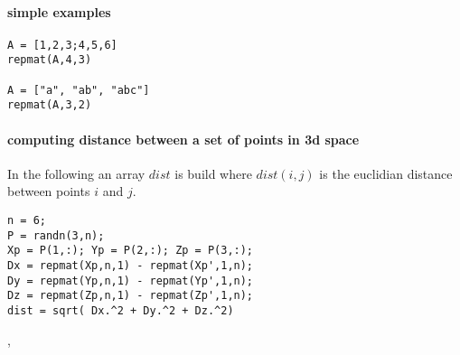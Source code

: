 \begin{examples}

\paragraph{simple examples}
\begin{Verbatim}
A = [1,2,3;4,5,6]
repmat(A,4,3)

A = ["a", "ab", "abc"]
repmat(A,3,2)
\end{Verbatim}

\paragraph{computing distance between a set of points in 3d space}

In the following an array $dist$ is build where $dist(i,j)$ is the 
euclidian distance between points $i$ and $j$.
\begin{Verbatim}
n = 6;
P = randn(3,n);
Xp = P(1,:); Yp = P(2,:); Zp = P(3,:);
Dx = repmat(Xp,n,1) - repmat(Xp',1,n);
Dy = repmat(Yp,n,1) - repmat(Yp',1,n);
Dz = repmat(Zp,n,1) - repmat(Zp',1,n);
dist = sqrt( Dx.^2 + Dy.^2 + Dz.^2)
\end{Verbatim}

\end{examples}


\begin{manseealso}
, 
\end{manseealso}
